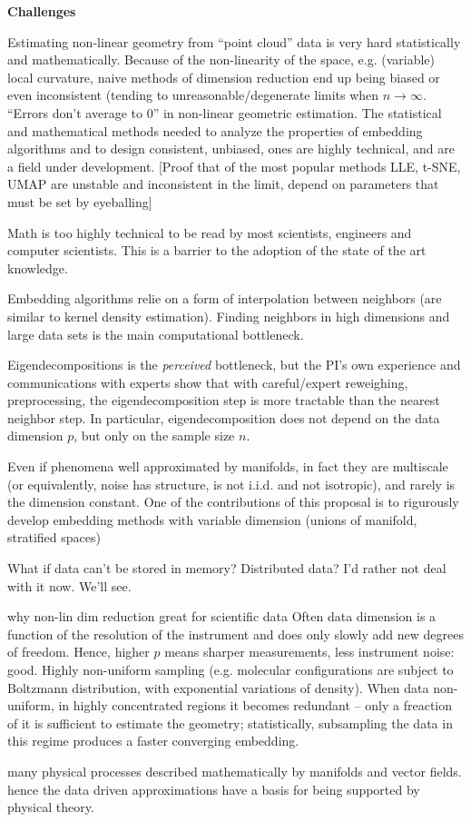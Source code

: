\documentclass[floatfix,11pt]{article}
\begin{document}
  \textbf{Challenges}
  \bit
\item Estimating non-linear geometry from ``point cloud'' data is very hard statistically and mathematically. Because of the non-linearity of the space, e.g.  (variable) local curvature, naive methods of dimension reduction end up being biased or even inconsistent (tending to unreasonable/degenerate limits when $n\rightarrow \infty$. ``Errors don't average to 0'' in non-linear geometric estimation. The statistical and mathematical methods needed to analyze the properties of embedding algorithms and to design consistent, unbiased, ones are highly technical, and are a field under development. [Proof that of the most popular methods LLE, t-SNE, UMAP are unstable and inconsistent in the limit, depend on parameters that must be set by eyeballing]
\item Math is too highly technical to be read by most scientists, engineers and computer scientists. This is a barrier to the adoption of the state of the art knowledge. 
\item Embedding algorithms relie on a form of interpolation between neighbors (are similar to kernel density estimation). Finding neighbors in high dimensions and large data sets is the main computational bottleneck. 
\item Eigendecompositions is the {\em perceived} bottleneck, but the PI's own experience and communications with experts show that with careful/expert reweighing, preprocessing, the eigendecomposition step is more tractable than the nearest neighbor step. In particular, eigendecomposition does not depend on the data dimension $p$, but only on the sample size $n$. 
\item Even if phenomena well approximated by manifolds, in fact they are multiscale (or equivalently, noise has structure, is not i.i.d. and not isotropic), and rarely is the dimension constant. One of the contributions of this proposal is to rigurously develop embedding methods with variable dimension (unions of manifold, stratified spaces)
\item What if data can't be stored in memory? Distributed data? I'd rather not deal with it now. We'll see. 

\item[why non-lin dim reduction great for scientific data] Often data dimension is a function of the resolution of the instrument and does only slowly add new degrees of freedom. Hence, higher $p$ means sharper measurements, less instrument noise: good. Highly non-uniform sampling (e.g. molecular configurations are subject to Boltzmann distribution, with exponential variations of density). When data non-uniform, in highly concentrated regions it becomes redundant -- only a freaction of it is sufficient to estimate the geometry; statistically, subsampling the data in this regime produces a faster converging embedding. 
\item many physical processes described mathematically by manifolds and vector fields. hence the data driven approximations have a basis for being supported by physical theory.
\eit
\end{document}
